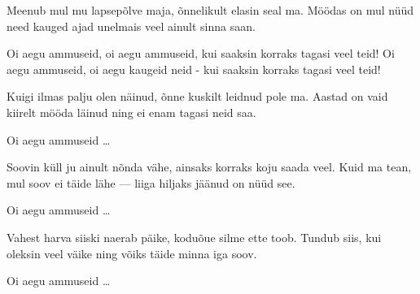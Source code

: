 Meenub mul mu lapsep\~olve maja,
\~onnelikult elasin seal ma.
M\"o\"odas on mul n\"u\"ud need kauged ajad
unelmais veel ainult sinna saan.

Oi aegu ammuseid, oi aegu ammuseid,
kui saaksin korraks tagasi veel teid!
Oi aegu ammuseid, oi aegu kaugeid neid -
kui saaksin korraks tagasi veel teid!

Kuigi ilmas palju olen n\"ainud,
\~onne kuskilt leidnud pole ma.
Aastad on vaid kiirelt m\"o\"oda l\"ainud
ning ei enam tagasi neid saa.

Oi aegu ammuseid \ldots

Soovin k\"ull ju ainult n\~onda v\"ahe,
ainsaks korraks koju saada veel.
Kuid ma tean, mul soov ei t\"aide l\"ahe ---
liiga hiljaks j\"a\"anud on n\"u\"ud see.

Oi aegu ammuseid \ldots

Vahest harva siiski naerab p\"aike,
kodu\~oue silme ette toob.
Tundub siis, kui oleksin veel v\"aike
ning v\~oiks t\"aide minna iga soov.

Oi aegu ammuseid \ldots